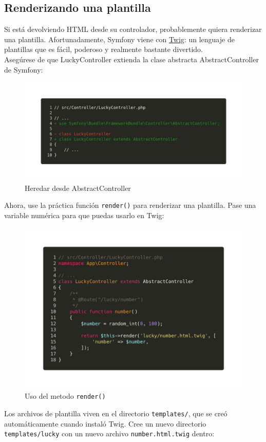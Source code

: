 \subsection{Renderizando una plantilla}

Si está devolviendo HTML desde su controlador, probablemente quiera renderizar una plantilla. Afortunadamente, Symfony viene con \href{https://twig.symfony.com/}{Twig}: un lenguaje de plantillas que es fácil, poderoso y realmente bastante divertido.
\medskip\\
Asegúrese de que LuckyController extienda la clase abstracta AbstractController de Symfony:

\begin{figure}[ht]
  \centering
  \includegraphics[width=\textwidth]{../assets/diff_lucky_controller.png}
  \caption{Heredar desde AbstractController}
  \label{fig:diff_lucky_controller}
\end{figure}

Ahora, use la práctica función \texttt{render()} para renderizar una plantilla. Pase una variable numérica para que puedas usarlo en Twig:

\begin{figure}[ht]
  \centering
  \includegraphics[width=\textwidth]{../assets/lucky_number_twig.png}
  \caption{Uso del metodo \texttt{render()}}
  \label{fig:lucky_number_twig}
\end{figure}
\clearpage
Los archivos de plantilla viven en el directorio \texttt{templates/}, que se creó automáticamente cuando instaló Twig. Cree un nuevo directorio \texttt{templates/lucky} con un nuevo archivo \texttt{number.html.twig} dentro:

